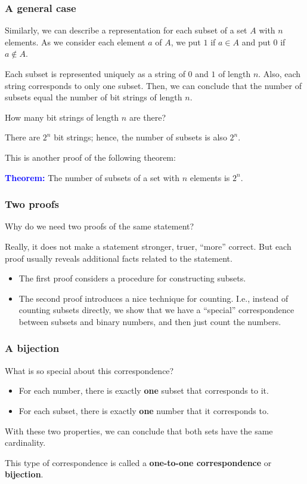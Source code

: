 \begin{frame}\frametitle{A general case}
  Similarly, we can describe a representation for each subset of a set
  $A$ with $n$ elements.  As we consider each element $a$ of $A$, we
  put $1$ if $a\in A$ and put $0$ if $a\not\in A$.
  \pause

  Each subset is represented uniquely as a string of $0$ and $1$ of
  length $n$.  Also, each string corresponds to only one subset.
  Then, we can conclude that the number of subsets equal the number of
  bit strings of length $n$.
  \pause

  How many bit strings of length $n$ are there?
  \pause

  \vspace{0.1in}

  There are $2^n$ bit strings; hence, the number of subsets is also
  $2^n$.
  \pause
  
  This is another proof of the following theorem:
  
  \begin{tcolorbox}
    {\bf \textcolor{blue}{Theorem:}} The number of subsets of a set with
    $n$ elements is $2^n$.
  \end{tcolorbox}
\end{frame}

\begin{frame}\frametitle{Two proofs}
  Why do we need two proofs of the same statement?
  \pause

  Really, it does not make a statement stronger, truer, ``more''
  correct.  But each proof usually reveals additional facts related to
  the statement.

  \begin{itemize}
  \item The first proof considers a procedure for constructing subsets.
  \item The second proof introduces a nice technique for counting.
    I.e., instead of counting subsets directly, we show that we have a
    ``special'' correspondence between subsets and binary numbers, and
    then just count the numbers.
  \end{itemize}
\end{frame}

\begin{frame}\frametitle{A bijection}
  What is so special about this correspondence?
  \pause

  \begin{itemize}
  \item For each number, there is exactly {\bf one} subset that
    corresponds to it.
  \item For each subset, there is exactly {\bf one} number that it
    corresponds to.
  \end{itemize}

  With these two properties, we can conclude that both sets have the
  same cardinality.

  \begin{tcolorbox}
    This type of correspondence is called a {\bf
      one-to-one correspondence} or {\bf bijection}.
  \end{tcolorbox}
\end{frame}

